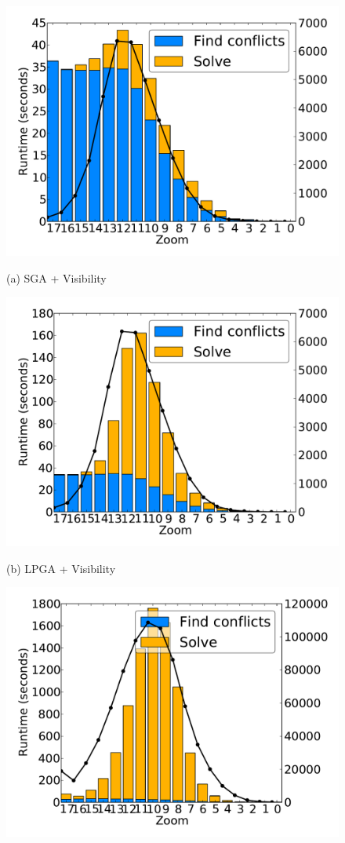 \documentclass[11pt, oneside]{report}
\begin{document}
\begin{figure}[tb]
  \begin{minipage}{0.329\linewidth}
    \centerline{\includegraphics[width=0.9\linewidth]{./figs-cvl/prelim_pnt_500k_tourism_heuristic_A.pdf}}
    \centerline{(a) SGA + Visibility}
  \end{minipage} \hfill
  \begin{minipage}{0.329\linewidth}
    \centerline{\includegraphics[width=0.9\linewidth]{./figs-cvl/prelim_pnt_500k_tourism_lp_A.pdf}}
    \centerline{(b) LPGA + Visibility}
  \end{minipage} \hfill
  \begin{minipage}{0.329\linewidth}
    \centerline{\includegraphics[width=0.9\linewidth]{./figs-cvl/prelim_pnt_500k_tourism_lp_B.pdf}}

\end{minipage}
\end{figure}
\end{document}
